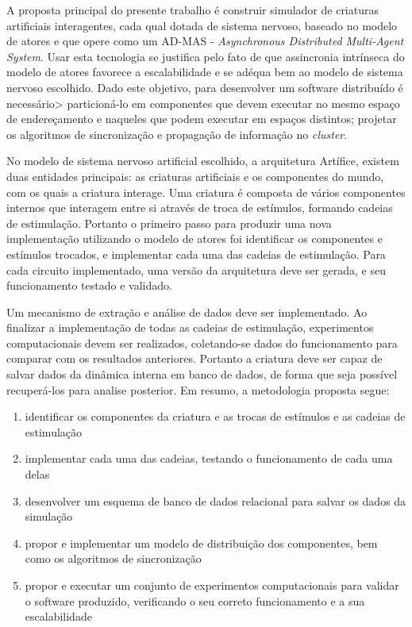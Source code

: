 A proposta principal do presente trabalho é construir simulador de criaturas artificiais interagentes, cada qual dotada de sistema nervoso, baseado no modelo de atores e que opere como um AD-MAS - \textit{Asynchronous Distributed Multi-Agent System}. Usar esta tecnologia se justifica pelo fato de que assincronia intrínseca do modelo de atores favorece a escalabilidade e se adéqua bem ao modelo de sistema nervoso escolhido. Dado este objetivo, para desenvolver um software distribuído é necessário> particioná-lo em componentes que devem executar no mesmo espaço de endereçamento e naqueles que podem executar em espaços distintos; projetar os algoritmos de sincronização e propagação de informação no \textit{cluster}.  

No modelo de sistema nervoso artificial escolhido, a arquitetura Artífice, existem duas entidades principais: as criaturas artificiais e os componentes do mundo, com os quais a criatura interage. Uma criatura é composta de vários componentes internos que interagem entre si através de troca de estímulos, formando cadeias de estimulação. Portanto o primeiro passo para produzir uma nova implementação utilizando o modelo de atores foi identificar os componentes e estímulos trocados, e implementar cada uma das cadeias de estimulação. Para cada circuito implementado, uma versão da arquitetura deve ser gerada, e seu funcionamento  testado e validado. 

Um mecanismo de extração e análise de dados deve ser implementado. Ao finalizar a implementação de todas as cadeias de estimulação, experimentos computacionais devem ser realizados, coletando-se dados do funcionamento para comparar com os resultados anteriores. Portanto a criatura deve ser capaz de salvar dados da dinâmica interna em banco de dados, de forma que seja possível recuperá-los para analise posterior. 
Em resumo, a metodologia proposta segue: 

\begin{enumerate}
\item identificar os componentes da criatura e as trocas de estímulos e as cadeias de estimulação

\item implementar cada uma das cadeias, testando o funcionamento de cada uma delas

\item desenvolver um esquema de banco de dados relacional para salvar os dados da simulação

\item propor e implementar um modelo de distribuição dos componentes, bem como os algoritmos de sincronização

\item propor e executar um conjunto de experimentos computacionais para validar o software produzido, verificando o seu correto funcionamento e a sua escalabilidade
\end{enumerate}

